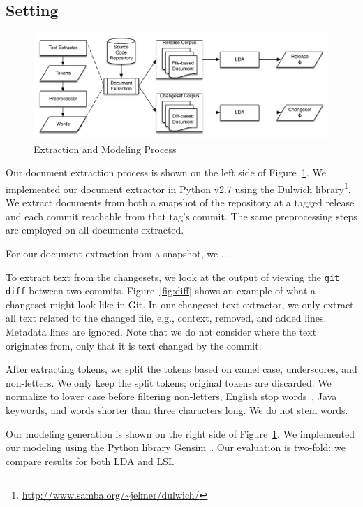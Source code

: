 
\subsection{Setting}

\begin{figure}[!th]
    \centering
    \includegraphics[width=.75\textwidth]{changeset}
    \caption{Extraction and Modeling Process}
    \label{fig:process}
\vspace{-10pt}
\end{figure}

Our document extraction process is shown on the left side of Figure~\ref{fig:process}.
We implemented our document extractor in Python v2.7
using the Dulwich library\footnote{\url{http://www.samba.org/~jelmer/dulwich/}}. %
We extract documents from both a snapshot of the repository at a tagged
release and each commit reachable from that tag's commit.
The same preprocessing steps are employed on all documents extracted.

For our document extraction from a snapshot, we ...

To extract text from the changesets, we look at the output of viewing
the \texttt{git diff} between two commits.
Figure~\ref{fig:diff} shows an example of what a changeset might look
like in Git.
In our changeset text extractor, we only extract all text related to the
changed file, e.g., context, removed, and added lines.  
Metadata lines are ignored.
Note that we do not consider where the text originates from,
only that it is text changed by the commit.

After extracting tokens, we split the tokens based on camel case,
underscores, and non-letters.
We only keep the split tokens; original tokens are discarded.
We normalize to lower case before filtering non-letters, English stop words~\cite{StopWords}, Java keywords, and words shorter than three characters long.
We do not stem words. 

Our modeling generation is shown on the right side of Figure~\ref{fig:process}.
We implemented our modeling using the Python library Gensim~\cite{Gensim}.
Our evaluation is two-fold: we compare results for both LDA and LSI.

